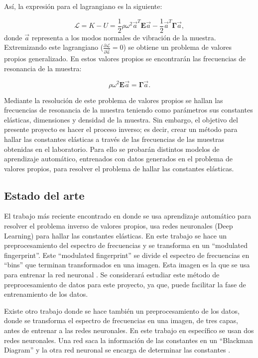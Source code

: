 \documentclass[12pt]{article}
\begin{document}
Así, la expresión para el lagrangiano es la siguiente: 

\begin{equation}
	\mathcal{L} = K - U = \frac{1}{2} \rho \omega^2 \vec{a}^{T}\bm{E}\vec{a} - \frac{1}{2} \vec{a}^{T}\bm{\Gamma}\vec{a},
\end{equation}
donde $\vec{a}$ representa a los modos normales de vibración de la muestra. Extremizando este lagrangiano ($\frac{\partial \mathcal{L}}{\partial \vec{a}} = 0$) se obtiene un problema de valores propios generalizado. En estos valores propios se encontrarán las frecuencias de resonancia de la muestra:

\begin{equation}
	\rho \omega^2 \bm{E} \vec{a} = \bm{\Gamma} \vec{a}.
	\label{eq:eigenvalue-problem}
\end{equation}

Mediante la resolución de este problema de valores propios se hallan las frecuencias de resonancia de la muestra teniendo como parámetros sus constantes elásticas, dimensiones y densidad de la muestra. Sin embargo, el objetivo del presente proyecto es hacer el proceso inverso; es decir, crear un método para hallar las constantes elásticas a través de las frecuencias de las muestras obtenidas en el laboratorio. Para ello se probarán distintos modelos de aprendizaje automático, entrenados con datos generados en el problema de valores propios, para resolver el problema de hallar las constantes elásticas. 

\subsection{Estado del arte}

El trabajo más reciente encontrado en donde se usa aprendizaje automático para resolver el problema inverso de valores propios, usa redes neuronales (Deep Learning) para hallar las constantes elásticas. En este trabajo se hace un preprocesamiento del espectro de frecuencias y se transforma en un ``modulated fingerprint''. Este ``modulated fingerprint'' se divide el espectro de frecuencias en ``bins''  que terminan transformados en una imagen. Esta imagen es la que se usa para entrenar la red neuronal \cite{Liu2023}. Se considerará estudiar este método de preprocesamiento de datos para este proyecto, ya que, puede facilitar la fase de entrenamiento de los datos.


Existe otro trabajo donde se hace también un preprocesamiento de los datos, donde se transforma el espectro de frecuencias en una imagen, de tres capas, antes de entrenar a las redes neuronales. En este trabajo en específico se usan dos redes neuronales. Una red saca la información de las constantes en un ``Blackman Diagram'' y la otra red neuronal se encarga de determinar las constantes \cite{Fukuda2023}. 
\end{document}
